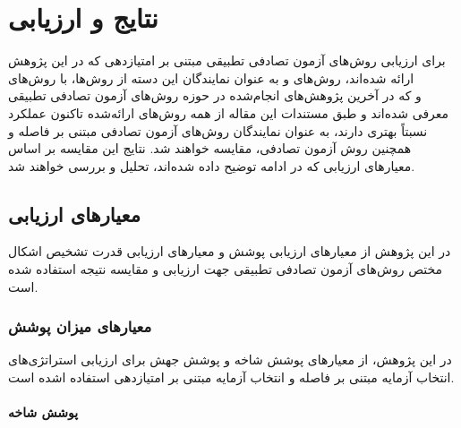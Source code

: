 \chapter{نتایج و ارزیابی}\label{chapter5}

برای ارزیابی روش‌های آزمون تصادفی تطبیقی مبتنی بر امتیازدهی که در این پژوهش ارائه شده‌اند، روش‌های  و  به عنوان نمایندگان این دسته از روش‌ها، با روش‌های \\
  و  \cite{chen2021novel} که در آخرین پژوهش‌های انجام‌شده در حوزه روش‌های آزمون تصادفی تطبیقی معرفی شده‌اند و طبق مستندات این مقاله از همه روش‌های ارائه‌شده تاکنون عملکرد نسبتاً بهتری دارند،  به عنوان نمایندگان روش‌های آزمون تصادفی مبتنی بر فاصله و همچنین روش آزمون تصادفی، مقایسه خواهند شد. نتایج این مقایسه بر اساس معیارهای ارزیابی که در ادامه توضیح داده شده‌اند، تحلیل و بررسی خواهند شد.

\section{معیارهای ارزیابی}

در این پژوهش از معیارهای ارزیابی پوشش و معیارهای ارزیابی قدرت تشخیص اشکال مختص روش‌های آزمون تصادفی تطبیقی جهت ارزیابی و مقایسه نتیجه استفاده شده است.

\subsection{معیارهای میزان پوشش}

در این پژوهش، از معیارهای پوشش شاخه و پوشش جهش برای ارزیابی استراتژی‌های انتخاب آزمایه مبتنی بر فاصله و انتخاب آزمایه مبتنی بر امتیازدهی استفاده اشده است.

\subsubsection{پوشش شاخه}

